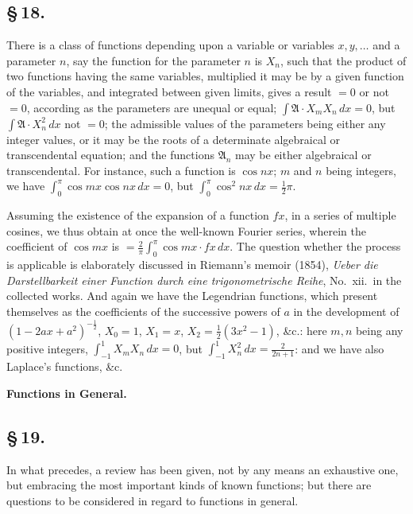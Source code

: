 \documentclass[11pt,a4paper]{article}
\begin{document}
\subsection*{\S\,18.}

There is a class of functions depending upon a variable or variables $x, y, \ldots$ and a parameter $n$, say the function for the parameter $n$ is $X_{n}$, such that the product of two functions having the same variables, multiplied it may be by a given function of the variables, and integrated between given limits, gives a result $= 0$ or not $= 0$, according as the parameters are unequal or equal; $\int \mathfrak{A} \cdot X_{m}X_{n}\,dx = 0$, but $\int \mathfrak{A} \cdot X_{n}^{2}\,dx$ not $= 0$; the admissible values of the parameters being either any integer values, or it may be the roots of a determinate algebraical or transcendental equation; and the functions $\mathfrak{A}_{n}$ may be either algebraical or transcendental. For instance, such a function is $\cos nx$; $m$ and $n$ being integers, we have $\int_{0}^{\pi}\cos mx \cos nx\,dx = 0$, but $\int_{0}^{\pi}\cos^{2}nx\,dx = \frac{1}{2}\pi$.

Assuming the existence of the expansion of a function $fx$, in a series of multiple cosines, we thus obtain at once the well-known Fourier series, wherein the coefficient of $\cos mx$ is $= \frac{2}{\pi}\int_{0}^{\pi}\cos mx \cdot fx\,dx$. The question whether the process is applicable is elaborately discussed in Riemann's memoir (1854), \textit{Ueber die Darstellbarkeit einer Function durch eine trigonometrische Reihe}, No.~xii.\ in the collected works. And again we have the Legendrian functions, which present themselves as the coefficients of the successive powers of $a$ in the development of $(1 - 2ax + a^{2})^{-\frac{1}{2}}$, $X_{0} = 1$, $X_{1} = x$, $X_{2} = \frac{1}{2}(3x^{2} - 1)$, \&c.: here $m, n$ being any positive integers, $\int_{-1}^{1}X_{m}X_{n}\,dx = 0$, but $\int_{-1}^{1}X_{n}^{2}\,dx = \frac{2}{2n + 1}$: and we have also Laplace's functions, \&c.

\smallskip
\begin{center}\textbf{Functions in General.}\end{center}

\subsection*{\S\,19.}

In what precedes, a review has been given, not by any means an exhaustive one, but embracing the most important kinds of known functions; but there are questions to be considered in regard to functions in general.
\end{document}
